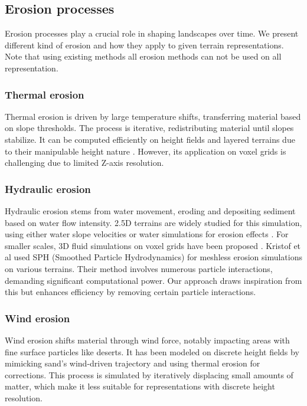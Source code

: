 \subsection{Erosion processes}
Erosion processes play a crucial role in shaping landscapes over time. We present different kind of erosion and how they apply to given terrain representations. Note that using existing methods all erosion methods can not be used on all representation.

\subsubsection{Thermal erosion}
Thermal erosion is driven by large temperature shifts, transferring material based on slope thresholds. The process is iterative, redistributing material until slopes stabilize. It can be computed efficiently on height fields and layered terrains due to their manipulable height nature \cite{Musgrave1989, Benes2001, Peytavie2009}. However, its application on voxel grids is challenging due to limited Z-axis resolution.

\subsubsection{Hydraulic erosion}
Hydraulic erosion stems from water movement, eroding and depositing sediment based on water flow intensity. 2.5D terrains are widely studied for this simulation, using either water slope velocities \cite{Neidhold2005} or water simulations for erosion effects \cite{Mei2007}. For smaller scales, 3D fluid simulations on voxel grids have been proposed \cite{Benes2006}. Kristof et al \cite{Kristof2009} used SPH (Smoothed Particle Hydrodynamics) for meshless erosion simulations on various terrains. Their method involves numerous particle interactions, demanding significant computational power. Our approach draws inspiration from this but enhances efficiency by removing certain particle interactions.

\subsubsection{Wind erosion}
Wind erosion shifts material through wind force, notably impacting areas with fine surface particles like deserts. It has been modeled on discrete height fields \cite{Roa2004, Paris2020} by mimicking sand's wind-driven trajectory and using thermal erosion for corrections. This process is simulated by iteratively displacing small amounts of matter, which make it less suitable for representations with discrete height resolution.

